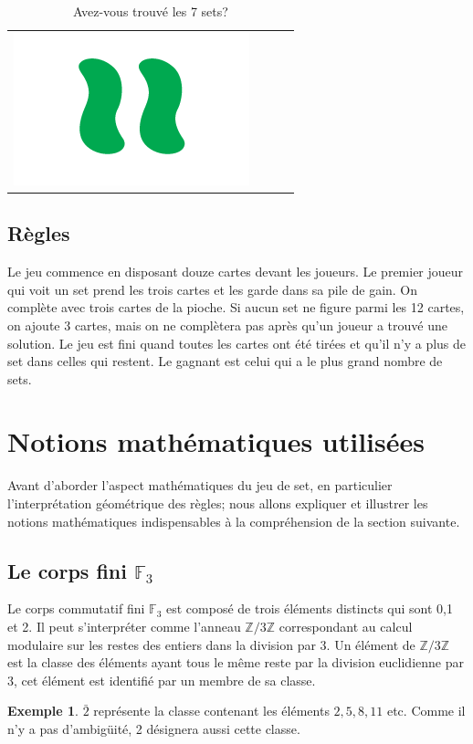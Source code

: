 \documentclass[a4paper,12pt,titlepage]{article}
\theoremstyle{plain}
\theoremstyle{definition}
\newtheorem{ex}{Exemple}
\begin{document}
\begin{table}[h]
\begin{tabular}{ c | c | c | c }
\includegraphics[scale=0.2]{Img/1011.png} \\
\end{tabular}
\caption{Avez-vous trouvé les 7 sets?}
\end{table}

\subsection{Règles}
Le jeu commence en disposant douze cartes devant les joueurs.
Le premier joueur qui voit un set prend les trois cartes et les garde dans sa pile de gain. 
On complète avec trois cartes de la pioche. Si aucun set ne figure parmi les 12 cartes, on ajoute 3 cartes, mais on ne complètera pas après qu'un joueur a trouvé une solution.
Le jeu est fini quand toutes les cartes ont été tirées et qu'il n'y a plus de set dans celles qui restent.
Le gagnant est celui qui a le plus grand nombre de sets. 

\newpage
\section{Notions mathématiques utilisées}
Avant d'aborder l'aspect mathématiques du jeu de set, en particulier l'interprétation géométrique des règles; nous allons expliquer et illustrer les notions mathématiques indispensables à la compréhension de la section suivante. 

\subsection{Le corps fini $\mathbb{F}_3$}
Le corps commutatif fini $\mathbb{F}_3$ est composé de trois éléments distincts qui sont 0,1 et 2. Il peut s'interpréter comme l'anneau $\mathbb{Z}/3\mathbb{Z}$ correspondant au calcul modulaire sur les restes des entiers dans la division par 3. Un élément de $\mathbb{Z}/3\mathbb{Z}$ est la classe des éléments ayant tous le même reste par la division euclidienne par 3, cet élément est identifié par un membre de sa classe.
\begin{ex}
$\bar{2}$ représente la classe contenant les éléments $2,5,8,11$ etc. Comme il n'y a pas d'ambigüité, 2 désignera aussi cette classe.
\end{ex}
\end{document}
